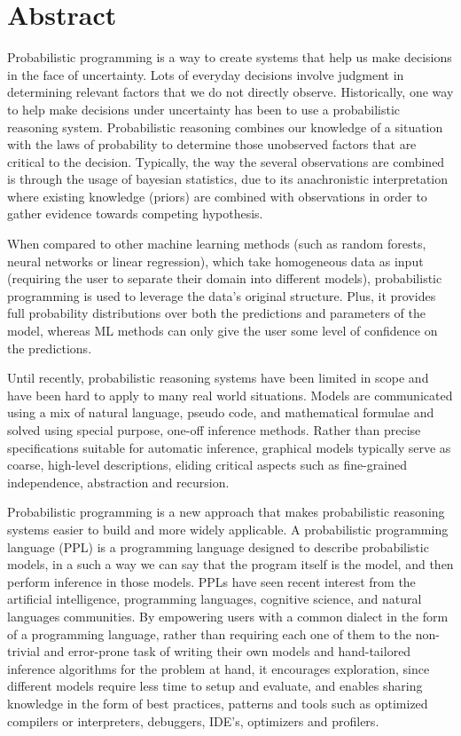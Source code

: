 \chapter*{Abstract}

Probabilistic programming is a way to create systems that help us make decisions
 in the face of uncertainty. Lots of everyday decisions involve judgment in
determining relevant factors that we do not directly observe. Historically, one
way to help make decisions under uncertainty has been to use a probabilistic
reasoning system.
Probabilistic reasoning combines our knowledge of a situation with the laws of
probability to determine those unobserved factors that are critical to the
decision. Typically, the way the several observations are combined is through
the usage of bayesian statistics, due to its anachronistic interpretation where
existing knowledge (priors) are combined with observations in order to gather
evidence towards competing hypothesis.

When compared to other machine learning methods (such as random forests, neural
networks or linear regression), which take homogeneous data as input (requiring
the user to separate their domain into different models), probabilistic
programming is used to leverage the data’s original structure. Plus, it
provides full probability distributions over both the predictions and
parameters of the model, whereas ML methods can only give the user some level
of confidence on the predictions.

Until recently, probabilistic reasoning systems have been limited in scope and
have been hard to apply to many real world situations. Models are communicated
using a mix of natural language, pseudo code, and mathematical formulae and
solved using special purpose, one-off inference methods. Rather than precise
specifications suitable for automatic inference, graphical models typically
serve as coarse, high-level descriptions, eliding critical aspects such as
fine-grained independence, abstraction and recursion.

Probabilistic programming is a new approach that makes probabilistic reasoning
systems easier to build and more widely applicable. A probabilistic programming
language (PPL) is a programming language designed to describe probabilistic
models, in a such a way we can say that the program itself is the model, and
then perform inference in those models. PPLs have seen recent interest from the
artificial intelligence, programming languages, cognitive science, and natural
languages communities. By empowering users with a common dialect in the form of
a programming language, rather than requiring each one of them to the non-trivial
and error-prone task of writing their own models and hand-tailored inference
algorithms for the problem at hand, it encourages exploration, since different
models require less time to setup and evaluate, and enables sharing knowledge
in the form of best practices, patterns and tools such as optimized compilers
or interpreters, debuggers, IDE’s, optimizers and profilers.


